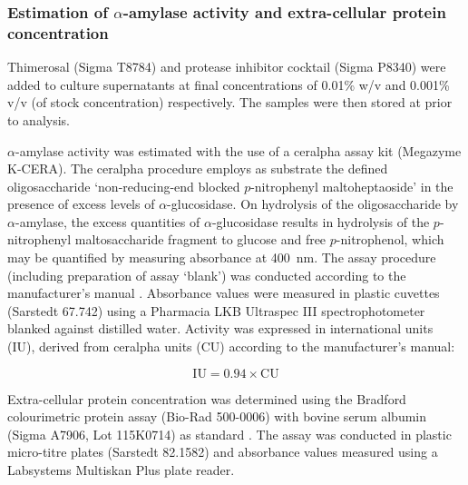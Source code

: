 \subsubsection{Estimation of $\alpha$-amylase activity and extra-cellular protein concentration}

Thimerosal (Sigma T8784) and protease inhibitor cocktail (Sigma P8340) were added to culture supernatants at final concentrations of 0.01\% w/v and 0.001\% v/v (of stock concentration) respectively. The samples were then stored at  prior to analysis.

$\alpha$-amylase activity was estimated with the use of a ceralpha assay kit (Megazyme K-CERA). The ceralpha procedure employs as substrate the defined oligosaccharide \lq non-reducing-end blocked $p$-nitrophenyl maltoheptaoside' in the presence of excess levels of $\alpha$-glucosidase. On hydrolysis of the oligosaccharide by $\alpha$-amylase, the excess quantities of $\alpha$-glucosidase results in hydrolysis of the $p$-nitrophenyl maltosaccharide fragment to glucose and free $p$-nitrophenol, which may be quantified by measuring absorbance at 400~nm. The assay procedure (including preparation of assay \lq blank') was conducted according to the manufacturer's manual \cite{megazyme}. Absorbance values were measured in plastic cuvettes (Sarstedt 67.742) using a Pharmacia LKB Ultraspec III spectrophotometer blanked against distilled water. Activity was expressed in international  units (IU), derived from ceralpha units (CU) according to the manufacturer's manual:

\begin{equation}
	\mbox{IU} = 0.94 \times \mbox{CU}
\end{equation}

Extra-cellular protein concentration was determined using the Bradford colourimetric protein assay (Bio-Rad 500-0006) with bovine serum albumin (Sigma A7906, Lot 115K0714) as standard \cite{bradford1976}. The assay was conducted in plastic micro-titre plates (Sarstedt 82.1582) and absorbance values measured using a Labsystems Multiskan Plus plate reader.